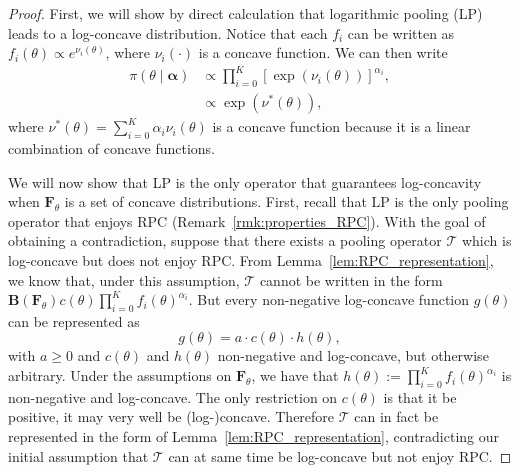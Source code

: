 \documentclass[12pt]{article}
\begin{document}
\begin{proof}
First, we will show by direct calculation that logarithmic pooling (LP) leads to a log-concave distribution.
Notice that each $f_i$ can be written as $ f_i(\theta) \propto e^{\nu_i(\theta)}$, where $\nu_i(\cdot)$ is a concave function.
We can then write
\begin{align*}
 \pi(\theta \mid \boldsymbol \alpha) &\propto \prod_{i=0}^{K} [\exp(\nu_i(\theta))]^{\alpha_i},\\
             &\propto \exp(\nu^{\ast}(\theta)),
\end{align*}
 where $\nu^{\ast}(\theta) = \sum_{i=0}^{K}\alpha_i\nu_i(\theta)$ is a concave function because it is a linear combination of concave functions.
 
We will now show that LP is the only operator that guarantees log-concavity when $\boldsymbol F_\theta$ is a set of concave distributions.
First, recall that LP is the only pooling operator that enjoys RPC (Remark~\ref{rmk:properties_RPC}).
With the goal of obtaining a contradiction, suppose that there exists a pooling operator $\mathcal{T}$ which is log-concave but does not enjoy RPC.
From Lemma~\ref{lem:RPC_representation}, we know that, under this assumption, $\mathcal{T}$ cannot be written in the form $\boldsymbol B(\boldsymbol F_\theta) c(\theta) \prod_{i=0}^K f_i(\theta)^{\alpha_i} $.
But every non-negative log-concave function $g(\theta)$ can be represented as
 \begin{equation}
 \label{eq:lc_rep}
  g(\theta) = a \cdot c(\theta) \cdot h(\theta),
 \end{equation}
with $a \geq 0$ and $c(\theta)$ and $h(\theta)$ non-negative and log-concave, but otherwise arbitrary.
Under the assumptions on $\boldsymbol F_\theta$, we have that $h(\theta) := \prod_{i=0}^K f_i(\theta)^{\alpha_i}$ is non-negative and log-concave.
The only restriction on $c(\theta)$ is that it be positive, it may very well be (log-)concave.
Therefore $\mathcal{T}$ can in fact be represented in the form of Lemma~\ref{lem:RPC_representation}, contradicting our initial assumption that $\mathcal{T}$ can at same time be log-concave but not enjoy RPC.  
\end{proof}
\end{document}
